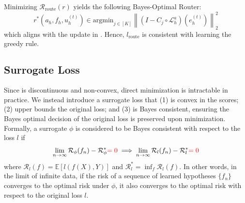 \documentclass{article}
\newcommand{\edit}[1]{{\color{red}#1}}
\begin{document}
Minimizing $\mathcal{R}_{\text{route}}\left(r\right)$ yields the following Bayes-Optimal Router:
\begin{equation}\label{eq:bayesoptimalrouter}
    r^*(a_h, f_h, u^{(t)}_h) \in \text{argmin}_{j \in [K]} \left\|\left( I - C_{j} \circ \mathcal{L}_{h}^a\right)\left(e^{(t)}_h\right)\right\|^2_2
\end{equation} 
which aligns with the update in . Hence, $l_{\text{route}}$ is consistent with learning the greedy rule.

\subsection{Surrogate Loss}\label{section:surrogate}

Since  is discontinuous and non-convex, direct minimization is intractable in practice. We instead introduce a surrogate loss that (1) is convex \edit{in the scores}; (2) upper bounds the original loss; and (3) is Bayes consistent, ensuring the Bayes optimal decision of the original loss is preserved upon minimization. Formally, a surrogate $\phi$ is considered to be Bayes consistent with respect to the loss $l$ if 
\begin{equation*}
    \lim_{n \to \infty} \mathcal{R}_{\phi}(f_n) - \mathcal{R}_{\phi}^* \edit{= 0} \implies \lim_{n \to \infty} \mathcal{R}_{l}(f_n) - \mathcal{R}_{l}^* \edit{= 0}
\end{equation*}
where $\mathcal{R}_{l}(f) = \mathbb{E}\left[l(f(X), Y)\right]$ and $\mathcal{R}_{l}^* = \inf_f\mathcal{R}_{l}(f)$. In other words, in the limit of infinite data, if the risk of a sequence of learned hypotheses $\{f_n\}$ converges to the optimal risk under $\phi$, it also converges to the optimal risk with respect to the original loss $l$.
\end{document}
